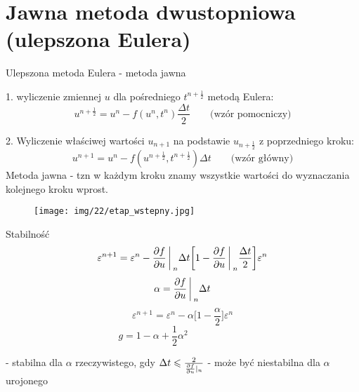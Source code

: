 \section{Jawna metoda dwustopniowa (ulepszona Eulera)}
\begin{frame}{Ulepszona metoda Eulera - metoda jawna}

	1. wyliczenie zmiennej $u$ dla pośredniego $t^{n+\frac{1}{2}}$ metodą Eulera:
    $$u^{n+\frac{1}{2}} = u^n - f(u^n,t^n)\frac{\Delta t}{2} \qquad \text{(wzór pomocniczy)}$$
    
    2. Wyliczenie właściwej wartości $u_{n+1}$ na podstawie $u_{n+\frac{1}{2}}$ z poprzedniego kroku:    
    $$u^{n+1} = u^n - f(u^{n+\frac{1}{2}},t^{n+\frac{1}{2}})\Delta t \qquad \text{(wzór główny)}$$
Metoda jawna - tzn w każdym kroku znamy wszystkie wartości do wyznaczania kolejnego kroku wprost.
\end{frame}
\begin{frame}
	 \begin{figure}
	\texttt{[image: img/22/etap\_wstepny.jpg]}
	\end{figure}
\end{frame}
\begin{frame}{Stabilność}
	$$\varepsilon^{n+1} = \varepsilon^n - \frac{\partial f}{\partial u}\bigg\arrowvert_n\Delta t\bigg[1-\frac{\partial f}{\partial u} \bigg\arrowvert_n\frac{\Delta t}{2}\bigg]\varepsilon^n$$
    $$\alpha = \frac{\partial f}{\partial u}\bigg\arrowvert_n \Delta t$$
    $$
    \varepsilon^{n+1} = \varepsilon^n - \alpha\bigg[ 1- \frac{\alpha}{2} \bigg]\varepsilon^n
     $$
     $$g = 1-\alpha +\frac{1}{2}\alpha^2 \qquad \qquad \qquad 
     $$
    
    \newline
    - stabilna dla $\alpha$ rzeczywistego, gdy $\Delta t \leqslant \frac{2}{\frac{\partial f}{\partial u}\arrowvert_n}$
    \newline
    - może być niestabilna dla $\alpha$ urojonego
\end{frame}
